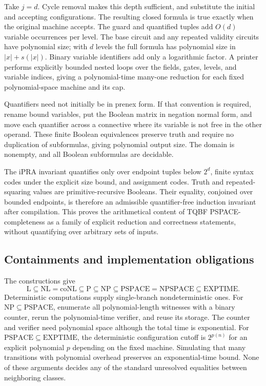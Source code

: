 Take $j=d$. Cycle removal makes this depth sufficient, and substitute the
initial and accepting configurations. The resulting closed formula is true
exactly when the original machine accepts. The guard and quantified tuples
add $O(d)$ variable occurrences per level. The base circuit and any repeated
validity circuits have polynomial size; with $d$ levels the full formula
has polynomial size in $|x|+s(|x|)$. Binary variable identifiers add only a
logarithmic factor. A printer performs explicitly bounded nested loops over
the fields, gates, levels, and variable indices, giving a polynomial-time
many-one reduction for each fixed polynomial-space machine and its cap.

Quantifiers need not initially be in prenex form. If that convention is
required, rename bound variables, put the Boolean matrix in negation normal
form, and move each quantifier across a connective where its variable is
not free in the other operand. These finite Boolean equivalences preserve
truth and require no duplication of subformulas, giving polynomial output
size. The domain is nonempty, and all Boolean subformulas are decidable.

The iPRA invariant quantifies only over endpoint tuples below $2^d$, finite
syntax codes under the explicit size bound, and assignment codes. Truth
and repeated-squaring values are primitive-recursive Booleans. Their
equality, conjoined over bounded endpoints, is therefore an admissible
quantifier-free induction invariant after compilation. This proves the
arithmetical content of TQBF PSPACE-completeness as a family of explicit
reduction and correctness statements, without quantifying over arbitrary
sets of inputs.

\subsection{Containments and implementation obligations}

The constructions give
\[
 \mathrm{L}\subseteq\mathrm{NL}=\mathrm{coNL}
 \subseteq\mathrm{P}\subseteq\mathrm{NP}
 \subseteq\mathrm{PSPACE}=\mathrm{NPSPACE}
 \subseteq\mathrm{EXPTIME}.
\]
Deterministic computations supply single-branch nondeterministic ones.
For $\mathrm{NP}\subseteq\mathrm{PSPACE}$, enumerate all polynomial-length
witnesses with a binary counter, rerun the polynomial-time verifier, and
reuse its storage. The counter and verifier need polynomial space although
the total time is exponential. For
$\mathrm{PSPACE}\subseteq\mathrm{EXPTIME}$, the deterministic configuration
cutoff is $2^{p(n)}$ for an explicit polynomial $p$ depending on the fixed
machine. Simulating that many transitions with polynomial overhead preserves
an exponential-time bound. None of these arguments decides any of the
standard unresolved equalities between neighboring classes.

